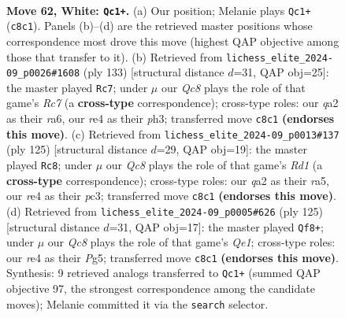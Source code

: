 \documentclass[11pt]{article}
\begin{document}
\clearpage

\begin{figure}[p]\centering
\begin{subfigure}{0.46\textwidth}\centering
\resizebox{\linewidth}{!}{%
\newchessgame
\chessboard[
  setfen={2Q5/8/5p2/3p2k1/4r3/6PK/q6P/8 w - - 4 62},
  showmover=false,
  pgfstyle=straightmove, color=movearrow, markmove={c8-c1}
]}
\caption{}
\end{subfigure}\hfill
\begin{subfigure}{0.46\textwidth}\centering
\resizebox{\linewidth}{!}{%
\newchessgame
\chessboard[
  setfen={8/8/R6p/6pk/8/6KP/2r5/8 b - - 11 67},
  showmover=false,
  pgfstyle=straightmove, color=movearrow, markmove={c2-c7}
]}
\caption{}
\end{subfigure}
\\[4pt]
\begin{subfigure}{0.46\textwidth}\centering
\resizebox{\linewidth}{!}{%
\newchessgame
\chessboard[
  setfen={3r4/8/4kp2/R5p1/P3K3/2P2P2/8/8 b - - 2 63},
  showmover=false,
  pgfstyle=straightmove, color=movearrow, markmove={d8-c8}
]}
\caption{}
\end{subfigure}\hfill
\begin{subfigure}{0.46\textwidth}\centering
\resizebox{\linewidth}{!}{%
\newchessgame
\chessboard[
  setfen={4q2k/1Q4p1/7p/6p1/6P1/5K1P/5P2/8 b - - 20 63},
  showmover=false,
  pgfstyle=straightmove, color=movearrow, markmove={e8-f8}
]}
\caption{}
\end{subfigure}
\caption{\textbf{Move 62, White: \texttt{Qc1+}.} (a) Our position; Melanie plays \texttt{Qc1+} (\texttt{c8c1}). Panels (b)--(d) are the retrieved master positions whose correspondence most drove this move (highest QAP objective among those that transfer to it). (b) Retrieved from \texttt{lichess\_elite\_2024-09\_p0026\#1608} (ply 133) [structural distance $d$=31, QAP obj=25]: the master played \texttt{Rc7}; under $\mu$ our \emph{Qc8} plays the role of that game's \emph{Rc7} (a \textbf{cross-type} correspondence); cross-type roles: our \emph{q}a2 as their \emph{r}a6, our \emph{r}e4 as their \emph{p}h3; transferred move \texttt{c8c1} \textbf{(endorses this move)}. (c) Retrieved from \texttt{lichess\_elite\_2024-09\_p0013\#137} (ply 125) [structural distance $d$=29, QAP obj=19]: the master played \texttt{Rc8}; under $\mu$ our \emph{Qc8} plays the role of that game's \emph{Rd1} (a \textbf{cross-type} correspondence); cross-type roles: our \emph{q}a2 as their \emph{r}a5, our \emph{r}e4 as their \emph{p}c3; transferred move \texttt{c8c1} \textbf{(endorses this move)}. (d) Retrieved from \texttt{lichess\_elite\_2024-09\_p0005\#626} (ply 125) [structural distance $d$=31, QAP obj=17]: the master played \texttt{Qf8+}; under $\mu$ our \emph{Qc8} plays the role of that game's \emph{Qe1}; cross-type roles: our \emph{r}e4 as their \emph{P}g5; transferred move \texttt{c8c1} \textbf{(endorses this move)}. Synthesis: 9 retrieved analogs transferred to \texttt{Qc1+} (summed QAP objective 97, the strongest correspondence among the candidate moves); Melanie committed it via the \texttt{search} selector.}
\label{fig:thought-m122}
\end{figure}
\end{document}
